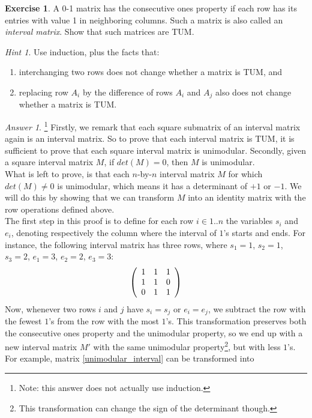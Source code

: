 \documentclass[titlepage]{book}
\makeatletter
\newcommand{\concept}[1]{\toindex{#1}\indexlayout{#1}}
\newcommand{\indexlayout}[1]{\emph{#1}}
\newcommand\toindex{\@ifstar{\@dblarg{\@toindexs}}{\@toindex}}
\def\@toindexs[#1]#2{\index{#1@#2}}
\newcommand\@toindex[2][]{%
  \if\relax\detokenize{#1}\relax
    \begingroup
    \@splitword#2\@nil%
    \uppercase\expandafter{%
      \expandafter\def\expandafter\@initial\expandafter{\@first}}%
    \toks0=\expandafter{\@initial}%
    \toks2=\expandafter{\@rest}%
    \edef\x{\endgroup\noexpand\index{\the\toks0 \the\toks2 }}\x
  \else
    \index{#1}
  \fi
}
\def\@splitword#1#2\@nil{\def\@first{#1}\def\@rest{#2}}
\theoremstyle{plain}
\theoremstyle{definition}
\newtheorem{exercise}{Exercise}[chapter]
\theoremstyle{remark}
\newtheorem{answer}{Answer}
\newtheorem{hint}{Hint}
\makeatother
\begin{document}
\begin{exercise}
A 0-1 matrix has the consecutive ones property if each row has its entries with value 1 in neighboring columns. Such a matrix is also called an \concept{interval matrix}. Show that such matrices are TUM.
\begin{hint}
Use induction, plus the facts that:
\begin{enumerate}
 \item interchanging two rows does not change whether a matrix is TUM, and
 \item replacing row $A_i$ by the difference of rows $A_i$ and $A_j$ also does not change whether a matrix is TUM.
\end{enumerate}
\end{hint}
\begin{answer}
\footnote{Note: this answer does not actually use induction.}
Firstly, we remark that each square submatrix of an interval matrix again is an interval matrix. So to prove that each interval matrix is TUM, it is sufficient to prove that each square interval matrix is unimodular. Secondly, given a square interval matrix $M$, if $det(M)=0$, then $M$ is unimodular.\\
What is left to prove, is that each $n$-by-$n$ interval matrix $M$ for which $det(M)\neq 0$ is unimodular, which means it has a determinant of $+1$ or $-1$. We will do this by showing that we can transform $M$ into an identity matrix with the row operations defined above.\\
The first step in this proof is to define for each row $i \in 1..n$ the variables $s_i$ and $e_i$, denoting respectively the column where the interval of $1$'s starts and ends. For instance, the following interval matrix has three rows, where $s_1=1$, $s_2=1$, $s_3=2$, $e_1=3$, $e_2=2$, $e_3=3$:
\begin{equation}
\label{unimodular_interval}
\left( \begin{array}{ccc}
1&1&1\\
1&1&0\\
0&1&1
\end{array} \right)
\end{equation}
Now, whenever two rows $i$ and $j$ have $s_i=s_j$ or $e_i=e_j$, we subtract the row with the fewest $1$'s from the row with the most $1$'s. This transformation preserves both the consecutive ones property and the unimodular property, so we end up with a new interval matrix $M'$ with the same unimodular property\footnote{This transformation can change the sign of the determinant though.}, but with less $1$'s. For example, matrix \ref{unimodular_interval} can be transformed into

\end{answer}
\end{exercise}
\end{document}
